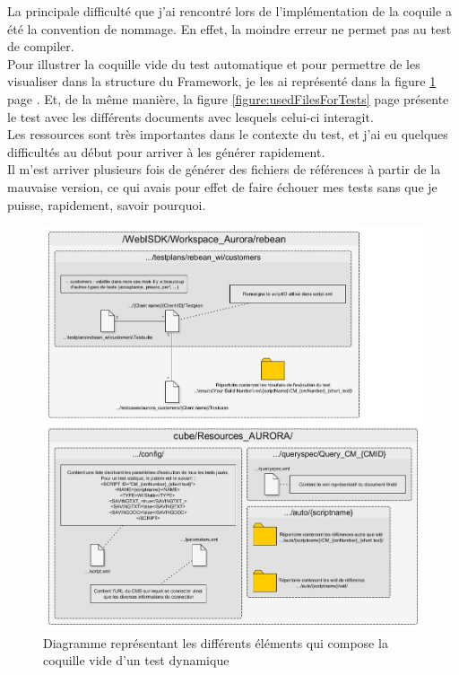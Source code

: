 La principale difficult\'{e} que j'ai rencontr\'{e} lors de l'impl\'{e}mentation de la coquile a \'{e}t\'{e} la convention de nommage. En effet, la moindre erreur ne permet pas au test de compiler.\\
Pour illustrer la coquille vide du test automatique et pour permettre de les visualiser dans la structure du \gls{Framework}, je les ai repr\'{e}sent\'{e} dans la figure \ref{figure:testEmptyShell} page \pageref{figure:testEmptyShell}. Et, de la m\^{e}me mani\`{e}re, la figure \ref{figure:usedFilesForTests} page \pageref{figure:usedFilesForTests} pr\'{e}sente le test avec les diff\'{e}rents documents avec lesquels celui-ci interagit.\\
Les ressources sont tr\`{e}s importantes dans le contexte du test, et j'ai eu quelques difficult\'{e}s au d\'{e}but pour arriver \`{a} les g\'{e}n\'{e}rer rapidement.\\
Il m'est arriver plusieurs fois de g\'{e}n\'{e}rer des fichiers de r\'{e}f\'{e}rences \`{a} partir de la mauvaise version, ce qui avais pour effet de faire \'{e}chouer mes tests sans que je puisse, rapidement, savoir pourquoi.\\
\begin{figure}[H]
  \centering
      \includegraphics[width=\textwidth]{images/testEmptyShell.jpg}
  \caption{Diagramme repr\'{e}sentant les diff\'{e}rents \'{e}l\'{e}ments qui compose la coquille vide d'un test dynamique}
	\label{figure:testEmptyShell}
\end{figure}
